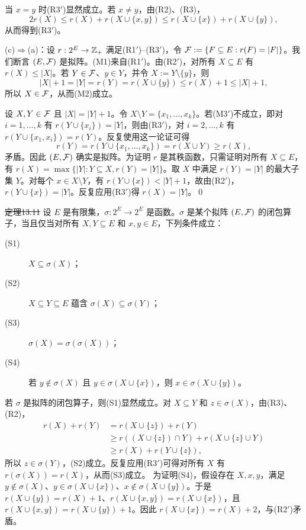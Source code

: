 当 $x=y$ 时(R3$'$)显然成立。若 $x\ne y$，由(R2)、(R3)，
\[2r(X)\le r(X)+r(X\cup\{x,y\})\le r(X\cup\{x\})+r(X\cup\{y\}),\]
从而得到(R3$'$)。

(c)$\Rightarrow$(a)：设 $r:2^E\to\mathbb Z_+$ 满足(R1$'$)--(R3$'$)，令 $\mathcal F:=\{F\subseteq E:r(F)=|F|\}$。我们断言 $(E,\mathcal F)$ 是拟阵。(M1)来自(R1$'$)。由(R2$'$)，对所有 $X\subseteq E$ 有 $r(X)\le|X|$。若 $Y\in\mathcal F$、$y\in Y$，并令 $X:=Y\setminus\{y\}$，则
\[|X|+1=|Y|=r(Y)=r(X\cup\{y\})\le r(X)+1\le|X|+1,\]
所以 $X\in\mathcal F$，从而(M2)成立。

设 $X,Y\in\mathcal F$ 且 $|X|=|Y|+1$。令 $X\setminus Y=\{x_1,\ldots,x_k\}$。若(M3$'$)不成立，即对 $i=1,\ldots,k$ 有 $r(Y\cup\{x_i\})=|Y|$，则由(R3$'$)，对 $i=2,\ldots,k$ 有 $r(Y\cup\{x_1,x_i\})=r(Y)$。反复使用这一论证可得
\[r(Y)=r(Y\cup\{x_1,\ldots,x_k\})=r(X\cup Y)\ge r(X),\]
矛盾。因此 $(E,\mathcal F)$ 确实是拟阵。为证明 $r$ 是其秩函数，只需证明对所有 $X\subseteq E$，有 $r(X)=\max\{|Y|:Y\subseteq X,r(Y)=|Y|\}$。取 $X$ 中满足 $r(Y)=|Y|$ 的最大子集 $Y$。对每个 $x\in X\setminus Y$，有 $r(Y\cup\{x\})<|Y|+1$，故由(R2$'$)，$r(Y\cup\{x\})=|Y|$。反复应用(R3$'$)得 $r(X)=|Y|$。\qed

\st{定理13.11} 设 $E$ 是有限集，$\sigma:2^E\to2^E$ 是函数。$\sigma$ 是某个拟阵 $(E,\mathcal F)$ 的闭包算子，当且仅当对所有 $X,Y\subseteq E$ 和 $x,y\in E$，下列条件成立：
\begin{description}
\item[(S1)] $X\subseteq\sigma(X)$；
\item[(S2)] $X\subseteq Y\subseteq E$ 蕴含 $\sigma(X)\subseteq\sigma(Y)$；
\item[(S3)] $\sigma(X)=\sigma(\sigma(X))$；
\item[(S4)] 若 $y\notin\sigma(X)$ 且 $y\in\sigma(X\cup\{x\})$，则 $x\in\sigma(X\cup\{y\})$。
\end{description}
\pr 若 $\sigma$ 是拟阵的闭包算子，则(S1)显然成立。对 $X\subseteq Y$ 和 $z\in\sigma(X)$，由(R3)、(R2)，
\begin{align*}
r(X)+r(Y)&=r(X\cup\{z\})+r(Y)\\
&\ge r((X\cup\{z\})\cap Y)+r(X\cup\{z\}\cup Y)\\
&\ge r(X)+r(Y\cup\{z\}),
\end{align*}
所以 $z\in\sigma(Y)$，(S2)成立。反复应用(R3$'$)可得对所有 $X$ 有 $r(\sigma(X))=r(X)$，从而(S3)成立。
为证明(S4)，假设存在 $X,x,y$，满足 $y\notin\sigma(X)$、$y\in\sigma(X\cup\{x\})$、$x\notin\sigma(X\cup\{y\})$。于是 $r(X\cup\{y\})=r(X)+1$、$r(X\cup\{x,y\})=r(X\cup\{x\})$，且 $r(X\cup\{x,y\})=r(X\cup\{y\})+1$。因此 $r(X\cup\{x\})=r(X)+2$，与(R2$'$)矛盾。

